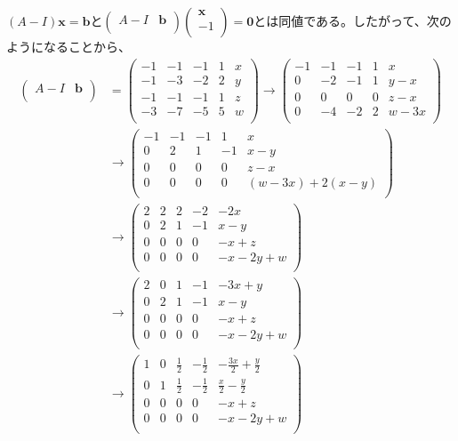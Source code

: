 \documentclass[dvipdfmx]{jsarticle}
\begin{document}
$(A - I)\mathbf{x} = \mathbf{b}$と$\begin{pmatrix}
A - I & \mathbf{b} \\
\end{pmatrix}\begin{pmatrix}
\mathbf{x} \\
 - 1 \\
\end{pmatrix} = \mathbf{0}$とは同値である。したがって、次のようになることから、
\begin{align*}
\begin{pmatrix}
A - I & \mathbf{b} \\
\end{pmatrix} &= \begin{pmatrix}
 - 1 & - 1 & - 1 & 1 & x \\
 - 1 & - 3 & - 2 & 2 & y \\
 - 1 & - 1 & - 1 & 1 & z \\
 - 3 & - 7 & - 5 & 5 & w \\
\end{pmatrix} \rightarrow \begin{pmatrix}
 - 1 & - 1 & - 1 & 1 & x \\
0 & - 2 & - 1 & 1 & y - x \\
0 & 0 & 0 & 0 & z - x \\
0 & - 4 & - 2 & 2 & w - 3x \\
\end{pmatrix}\\
&\rightarrow \begin{pmatrix}
 - 1 & - 1 & - 1 & 1 & x \\
0 & 2 & 1 & - 1 & x - y \\
0 & 0 & 0 & 0 & z - x \\
0 & 0 & 0 & 0 & (w - 3x) + 2(x - y) \\
\end{pmatrix}\\
&\rightarrow \begin{pmatrix}
2 & 2 & 2 & - 2 & - 2x \\
0 & 2 & 1 & - 1 & x - y \\
0 & 0 & 0 & 0 & - x + z \\
0 & 0 & 0 & 0 & - x - 2y + w \\
\end{pmatrix}\\
&\rightarrow \begin{pmatrix}
2 & 0 & 1 & - 1 & - 3x + y \\
0 & 2 & 1 & - 1 & x - y \\
0 & 0 & 0 & 0 & - x + z \\
0 & 0 & 0 & 0 & - x - 2y + w \\
\end{pmatrix}\\
&\rightarrow \begin{pmatrix}
1 & 0 & \frac{1}{2} & - \frac{1}{2} & - \frac{3x}{2} + \frac{y}{2} \\
0 & 1 & \frac{1}{2} & - \frac{1}{2} & \frac{x}{2} - \frac{y}{2} \\
0 & 0 & 0 & 0 & - x + z \\
0 & 0 & 0 & 0 & - x - 2y + w \\
\end{pmatrix}
\end{align*}
\end{document}
